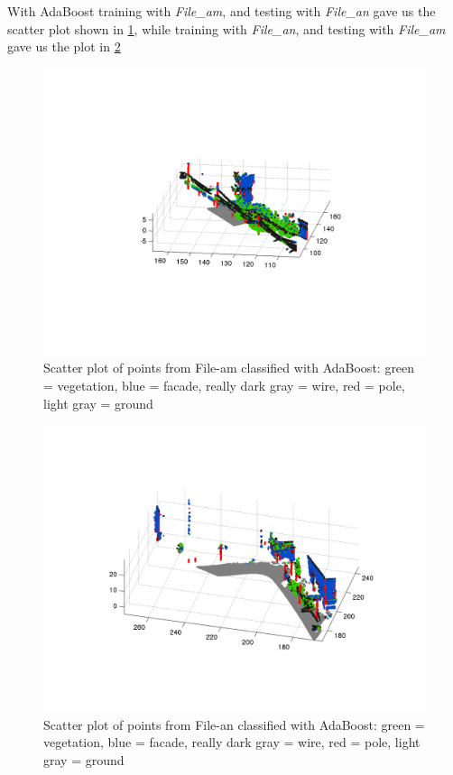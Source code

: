 \documentclass[letterpaper]{article}
\begin{document}
With AdaBoost training with \textit{File\_am}, and testing with \textit{File\_an} gave us the scatter plot shown in \ref{Fig_Ada1}, while training with \textit{File\_an}, and testing with \textit{File\_am} gave us the plot in \ref{Fig_Ada2}
\begin{figure}[t]
\includegraphics[width=.8\linewidth]{boost_trainam_testan.png}
\caption{Scatter plot of points from File-am classified with AdaBoost: green = vegetation, blue = facade, really dark gray = wire, red = pole, light gray = ground}
\label{Fig_Ada1}
\end{figure}
\begin{figure}[t]
\includegraphics[width=.8\linewidth]{boost_trainan_testam.png}
\caption{Scatter plot of points from File-an classified with AdaBoost: green = vegetation, blue = facade, really dark gray = wire, red = pole, light gray = ground}
\label{Fig_Ada2}
\end{figure}
\end{document}
